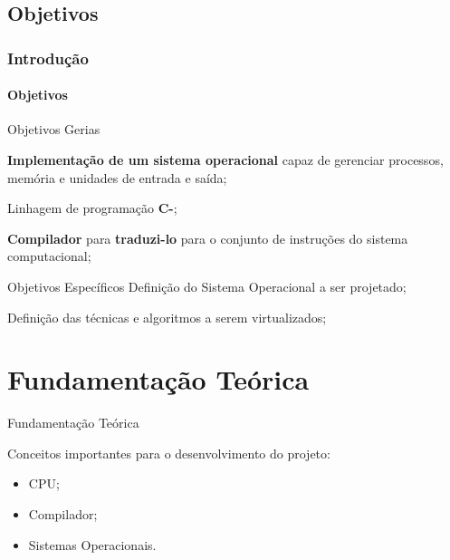 \documentclass[aspectratio=169]{beamer}
\begin{document}
	\subsection{Objetivos}
	\begin{frame}
		\frametitle{Introdução}	
		\framesubtitle{Objetivos}
		
		  \begin{block}{Objetivos Gerias}
		  			  		
			  	\textbf{Implementaç\~ao de um sistema operacional} capaz de gerenciar processos, memória e unidades de entrada e saída;
			  	
			  	\vspace{0.5cm}
		  	
			  	Linhagem de programação \textbf{C-};
			  	
			  	
			  	\vspace{0.2cm}
			  	
			  	\textbf{Compilador} para \textbf{traduzi-lo} para o conjunto de instruções do sistema computacional;
			
		  \end{block}
		  
		  \vspace{0.5cm}
		  
		  \begin{block}{Objetivos Específicos}
			  Definição do Sistema Operacional a ser projetado;
			  
			  \vspace{0.5cm}
			  
			  Definição das técnicas e algoritmos a serem virtualizados;
		  \end{block}
		
		
	\end{frame}

		

	\section{Fundamentação Teórica}
	\begin{frame}{Fundamentação Teórica}
		
		Conceitos importantes para o desenvolvimento do projeto:
		
		\vspace{0.5cm}
		
		\begin{itemize}
			\item CPU;
			
			\vspace{0.5cm}
			
			\item Compilador;
			
			\vspace{0.5cm}
			
			\item Sistemas Operacionais.
		\end{itemize}
	\end{frame}
	
\end{document}
